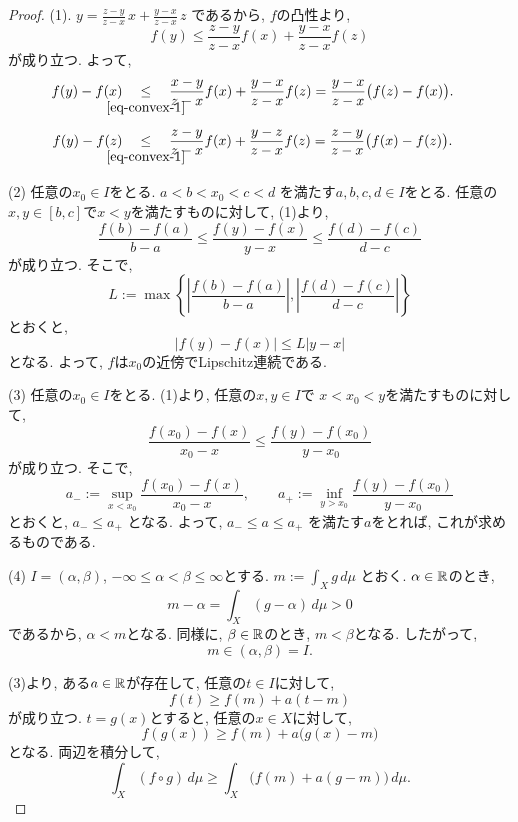 \begin{proof}
(1).
\(
y
=
\frac{z-y}{z-x}\,x
+
\frac{y-x}{z-x}\,z
\)
であるから, $f$の凸性より,
\begin{equation}
\label{eq-convex-1}
f(y)
\leq
\frac{z-y}{z-x}f(x)
+
\frac{y-x}{z-x}f(z)
\end{equation}
が成り立つ.
よって,
\[
\begin{aligned}
f(y)-f(x)
&\underalign{\eqref{eq-convex-1}}{\leq}
\frac{x-y}{z-x}f(x)
+
\frac{y-x}{z-x}f(z)
=
\frac{y-x}{z-x}\bigl(f(z)-f(x)\bigr).
\end{aligned}
\]
\[
\begin{aligned}
f(y)-f(z)
&\underalign{\eqref{eq-convex-1}}{\leq}
\frac{z-y}{z-x}f(x)
+
\frac{y-z}{z-x}f(z)
=
\frac{z-y}{z-x}\bigl(f(x)-f(z)\bigr).
\end{aligned}
\]

(2) 任意の$x_0 \in I$をとる.
\(
a<b<x_0<c<d
\)
を満たす$a,b,c,d \in I$をとる.
任意の$x,y \in [b,c]$で$x<y$を満たすものに対して,
(1)より,
\[
\frac{f(b)-f(a)}{b-a}
\leq
\frac{f(y)-f(x)}{y-x}
\leq
\frac{f(d)-f(c)}{d-c}
\]
が成り立つ.
そこで,
\[
L:=
\max\left\{
\left|\frac{f(b)-f(a)}{b-a}\right|,
\left|\frac{f(d)-f(c)}{d-c}\right|
\right\}
\]
とおくと,
\[
|f(y)-f(x)| \leq L|y-x|
\]
となる.
よって, $f$は$x_0$の近傍でLipschitz連続である.

(3) 任意の$x_0 \in I$をとる.
(1)より, 任意の$x,y \in I$で
$x<x_0<y$を満たすものに対して,
\[
\frac{f(x_0)-f(x)}{x_0-x}
\leq
\frac{f(y)-f(x_0)}{y-x_0}
\]
が成り立つ.
そこで,
\[
a_-:=
\sup_{x<x_0}
\frac{f(x_0)-f(x)}{x_0-x},
\qquad
a_+:=
\inf_{y>x_0}
\frac{f(y)-f(x_0)}{y-x_0}
\]
とおくと,
\(
a_- \leq a_+
\)
となる.
よって,
\(
a_- \leq a \leq a_+
\)
を満たす$a$をとれば, これが求めるものである.


(4) $I=(\alpha,\beta)$,
$-\infty \leq \alpha<\beta \leq \infty$とする.
\(
m:=\int_X g\,d\mu
\)
とおく.
$\alpha \in \mathbb{R}$のとき,
\[
m-\alpha
=
\int_X (g-\alpha)\,d\mu
>0
\]
であるから, $\alpha<m$となる.
同様に, $\beta \in \mathbb{R}$のとき, $m<\beta$となる.
したがって,
\[
m \in (\alpha,\beta)=I.
\]

(3)より, ある$a \in \mathbb{R}$が存在して,
任意の$t \in I$に対して,
\[
f(t) \geq f(m)+a(t-m)
\]
が成り立つ.
$t=g(x)$とすると, 任意の$x \in X$に対して,
\[
f(g(x))
\geq
f(m)+a\bigl(g(x)-m\bigr)
\]
となる.
両辺を積分して,
\[
\int_X (f \circ g)\,d\mu
\geq
\int_X \bigl(f(m)+a(g-m)\bigr)\,d\mu.
\]

\end{proof}



